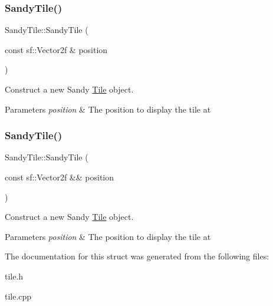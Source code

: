 \subsubsection{\texorpdfstring{SandyTile()}{SandyTile()}\hspace{0.1cm}{\footnotesize\ttfamily [1/2]}}
{\footnotesize\ttfamily Sandy\+Tile\+::\+Sandy\+Tile (\begin{DoxyParamCaption}\item[{const sf\+::\+Vector2f \&}]{position }\end{DoxyParamCaption})\hspace{0.3cm}{\ttfamily [explicit]}}



Construct a new Sandy \mbox{\hyperlink{classRose_1_1Tile}{Tile}} object. 


\begin{DoxyParams}{Parameters}
{\em position} & The position to display the tile at \\
\hline
\end{DoxyParams}
\mbox{\label{structRose_1_1SandyTile_abf3581d4b2dbb27675ed3f1eab38324d}} 
\subsubsection{\texorpdfstring{SandyTile()}{SandyTile()}\hspace{0.1cm}{\footnotesize\ttfamily [2/2]}}
{\footnotesize\ttfamily Sandy\+Tile\+::\+Sandy\+Tile (\begin{DoxyParamCaption}\item[{const sf\+::\+Vector2f \&\&}]{position }\end{DoxyParamCaption})\hspace{0.3cm}{\ttfamily [explicit]}}



Construct a new Sandy \mbox{\hyperlink{classRose_1_1Tile}{Tile}} object. 


\begin{DoxyParams}{Parameters}
{\em position} & The position to display the tile at \\
\hline
\end{DoxyParams}


The documentation for this struct was generated from the following files\+:\begin{DoxyCompactItemize}
\item 
tile.\+h\item 
tile.\+cpp\end{DoxyCompactItemize}
